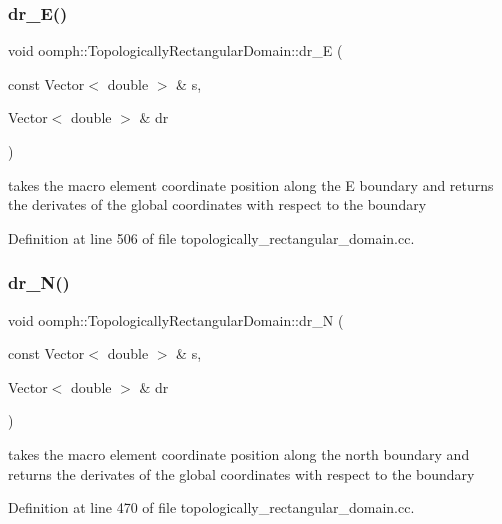 \subsubsection{\texorpdfstring{dr\+\_\+\+E()}{dr\_E()}}
{\footnotesize\ttfamily void oomph\+::\+Topologically\+Rectangular\+Domain\+::dr\+\_\+E (\begin{DoxyParamCaption}\item[{const Vector$<$ double $>$ \&}]{s,  }\item[{Vector$<$ double $>$ \&}]{dr }\end{DoxyParamCaption})\hspace{0.3cm}{\ttfamily [private]}}



takes the macro element coordinate position along the E boundary and returns the derivates of the global coordinates with respect to the boundary 



Definition at line 506 of file topologically\+\_\+rectangular\+\_\+domain.\+cc.

\mbox{\label{classoomph_1_1TopologicallyRectangularDomain_ad37cd9d2ee8eb90125d66be63d5b97c7}} 
\subsubsection{\texorpdfstring{dr\+\_\+\+N()}{dr\_N()}}
{\footnotesize\ttfamily void oomph\+::\+Topologically\+Rectangular\+Domain\+::dr\+\_\+N (\begin{DoxyParamCaption}\item[{const Vector$<$ double $>$ \&}]{s,  }\item[{Vector$<$ double $>$ \&}]{dr }\end{DoxyParamCaption})\hspace{0.3cm}{\ttfamily [private]}}



takes the macro element coordinate position along the north boundary and returns the derivates of the global coordinates with respect to the boundary 



Definition at line 470 of file topologically\+\_\+rectangular\+\_\+domain.\+cc.

